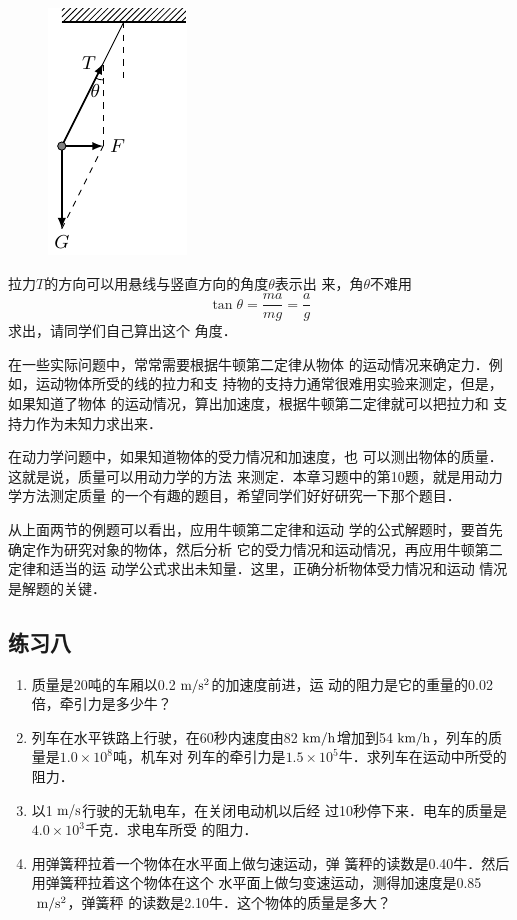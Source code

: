 \begin{figure}[htbp]
    \centering
    \includegraphics{fig/A/3-11.pdf}
    \caption{}\label{fig_A_3-11}
\end{figure}

    拉力$T$的方向可以用悬线与竖直方向的角度$\theta$表示出
来，角$\theta$不难用\[\tan\theta =\frac{ma}{mg}=\frac{a}{g} \]
求出，请同学们自己算出这个
角度．

    在一些实际问题中，常常需要根据牛顿第二定律从物体
的运动情况来确定力．例如，运动物体所受的线的拉力和支
持物的支持力通常很难用实验来测定，但是，如果知道了物体
的运动情况，算出加速度，根据牛顿第二定律就可以把拉力和
支持力作为未知力求出来．

    在动力学问题中，如果知道物体的受力情况和加速度，也
可以测出物体的质量．这就是说，质量可以用动力学的方法
来测定．本章习题中的第10题，就是用动力学方法测定质量
的一个有趣的题目，希望同学们好好研究一下那个题目．

    从上面两节的例题可以看出，应用牛顿第二定律和运动
学的公式解题时，要首先确定作为研究对象的物体，然后分析
它的受力情况和运动情况，再应用牛顿第二定律和适当的运
动学公式求出未知量．这里，正确分析物体受力情况和运动
情况是解题的关键．

 \subsection*{练习八}
\begin{enumerate}
\item 质量是20吨的车厢以0.2$\;\text{m}/\text{s}^2$的加速度前进，运
动的阻力是它的重量的0.02倍，牵引力是多少牛？
\item  列车在水平铁路上行驶，在60秒内速度由82$\;\text{km}/\text{h}$增加到54$\;\text{km}/\text{h}$，列车的质量是$1.0\times 10^8$吨，机车对
列车的牵引力是$1.5\times 10^5$牛．求列车在运动中所受的阻力．
\item  以1$\;\text{m}/\text{s}$行驶的无轨电车，在关闭电动机以后经
过10秒停下来．电车的质量是$4.0\times 10^3$千克．求电车所受
的阻力．
\item  用弹簧秤拉着一个物体在水平面上做匀速运动，弹
簧秤的读数是0.40牛．然后用弹簧秤拉着这个物体在这个
水平面上做匀变速运动，测得加速度是0.85$\;\text{m}/\text{s}^2$，弹簧秤
的读数是2.10牛．这个物体的质量是多大？
\end{enumerate}

